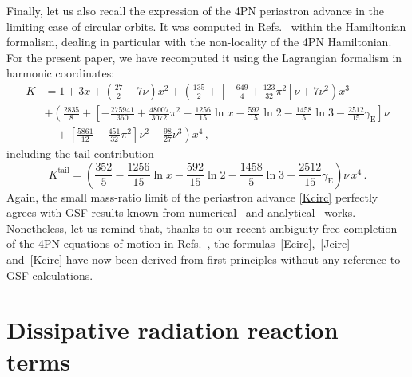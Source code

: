 \documentclass[prd,preprint,superscriptaddress,tightenlines,nofootinbib,
  eqsecnum,showpacs]{revtex4}
\begin{document}
Finally, let us also recall the expression of the 4PN periastron advance in
the limiting case of circular orbits. It was computed in Refs.~\cite{DJS15eob,
  DJS16, BBBFMb} within the Hamiltonian formalism, dealing in particular
with the non-locality of the 4PN Hamiltonian. For the present paper, we have recomputed it using the Lagrangian formalism in harmonic coordinates:
%
\begin{align}\label{Kcirc}
K &= 1 + 3 x + \left(\frac{27}{2} - 7\nu\right) x^2 +
\left(\frac{135}{2}
+\left[-\frac{649}{4}+\frac{123}{32}\pi^2\right]\nu+ 7\nu^2\right) x^3
\nonumber\\& + \left(\frac{2835}{8}
+\left[-\frac{275941}{360}+\frac{48007}{3072}\pi^2 -
  \frac{1256}{15}\ln x - \frac{592}{15}\ln 2 - \frac{1458}{5}\ln 3 -
  \frac{2512}{15}\gamma_\text{E}\right]\nu
\right.\nonumber\\&\left.\quad+
\left[\frac{5861}{12}-\frac{451}{32}\pi^2\right]\nu^2 -
\frac{98}{27}\nu^3\right) x^4\,,
\end{align}
%
including the tail contribution 
%
\begin{equation}\label{Ktailcirc}
K^\text{tail} = \left(\frac{352}{5} - \frac{1256}{15}\ln x -
\frac{592}{15}\ln 2 - \frac{1458}{5}\ln 3 -
\frac{2512}{15}\gamma_\text{E}\right)\nu \,x^4\,.
\end{equation}
%
Again, the small mass-ratio limit of the periastron advance \eqref{Kcirc}
perfectly agrees with GSF results known from numerical~\cite{BDS10,
  Letal11, vdM16} and analytical~\cite{D10sf, DJS15eob, DJS16, BL17} works.
Nonetheless, let us remind that, thanks to our recent ambiguity-free
completion of the 4PN equations of motion in Refs.~\cite{BBBFMc, MBBF17}, the
formulas~\eqref{Ecirc},~\eqref{Jcirc} and~\eqref{Kcirc} have now been derived
from first principles without any reference to GSF calculations.

\section{Dissipative radiation reaction terms} 
\label{sec:diss} 
\end{document}
